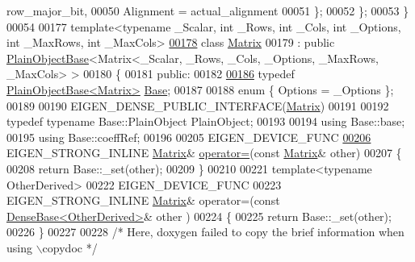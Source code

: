 \begin{DoxyCode}
      row\_major\_bit,
00050     Alignment = actual\_alignment
00051   \};
00052 \};
00053 \}
00054 
00177 \textcolor{keyword}{template}<\textcolor{keyword}{typename} \_Scalar, \textcolor{keywordtype}{int} \_Rows, \textcolor{keywordtype}{int} \_Cols, \textcolor{keywordtype}{int} \_Options, \textcolor{keywordtype}{int} \_MaxRows, \textcolor{keywordtype}{int} \_MaxCols>
\hyperlink{group___core___module}{00178} \textcolor{keyword}{class }\hyperlink{group___core___module_class_eigen_1_1_matrix}{Matrix}
00179   : \textcolor{keyword}{public} \hyperlink{class_eigen_1_1_plain_object_base}{PlainObjectBase}<Matrix<\_Scalar, \_Rows, \_Cols, \_Options, \_MaxRows, \_MaxCols> >
00180 \{
00181   \textcolor{keyword}{public}:
00182 
\hyperlink{group___core___module_a9f405923954599ec7a71ee6bad2c53f1}{00186}     \textcolor{keyword}{typedef} \hyperlink{class_eigen_1_1_plain_object_base}{PlainObjectBase<Matrix>} \hyperlink{group___core___module_a9f405923954599ec7a71ee6bad2c53f1}{Base};
00187 
00188     \textcolor{keyword}{enum} \{ Options = \_Options \};
00189 
00190     EIGEN\_DENSE\_PUBLIC\_INTERFACE(\hyperlink{group___core___module_class_eigen_1_1_matrix}{Matrix})
00191 
00192     \textcolor{keyword}{typedef} \textcolor{keyword}{typename} Base::PlainObject PlainObject;
00193 
00194     \textcolor{keyword}{using} Base::base;
00195     \textcolor{keyword}{using} Base::coeffRef;
00196 
00205     EIGEN\_DEVICE\_FUNC
\hyperlink{group___core___module_aa123b56b10819a0cbf5164abb242102f}{00206}     EIGEN\_STRONG\_INLINE \hyperlink{group___core___module_class_eigen_1_1_matrix}{Matrix}& \hyperlink{group___core___module_aa123b56b10819a0cbf5164abb242102f}{operator=}(\textcolor{keyword}{const} \hyperlink{group___core___module_class_eigen_1_1_matrix}{Matrix}& other)
00207     \{
00208       \textcolor{keywordflow}{return} Base::\_set(other);
00209     \}
00210 
00221     \textcolor{keyword}{template}<\textcolor{keyword}{typename} OtherDerived>
00222     EIGEN\_DEVICE\_FUNC
00223     EIGEN\_STRONG\_INLINE \hyperlink{group___core___module_class_eigen_1_1_matrix}{Matrix}& operator=(\textcolor{keyword}{const} \hyperlink{group___core___module_class_eigen_1_1_dense_base}{DenseBase<OtherDerived>}& other
      )
00224     \{
00225       \textcolor{keywordflow}{return} Base::\_set(other);
00226     \}
00227 
00228     \textcolor{comment}{/* Here, doxygen failed to copy the brief information when using \(\backslash\)copydoc */}

\end{DoxyCode}
